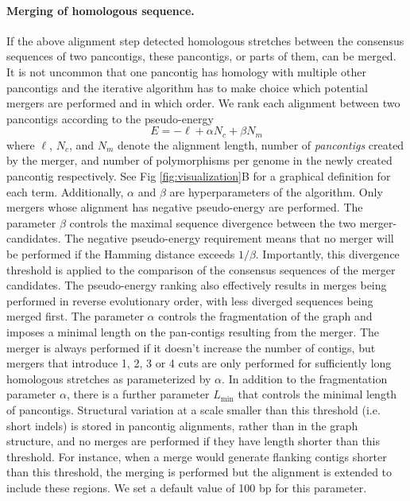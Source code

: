 \documentclass[aps,rmp,preprint,superscriptaddress,10pt,linenumbers]{revtex4-1}
\newcommand{\Lthr}{L_{\min}}
\begin{document}
\paragraph*{Merging of homologous sequence.}
If the above alignment step detected homologous stretches between the consensus sequences of two pancontigs, these pancontigs, or parts of them, can be merged.
It is not uncommon that one pancontig has homology with multiple other pancontigs and the iterative algorithm has to make choice which potential mergers are performed and in which order.
We rank each alignment between two pancontigs according to the pseudo-energy
\begin{equation}\label{eq:pseudo-energy}
    E = -\ell + \alpha N_c + \beta N_m
\end{equation}
where $\ell$, $N_c$, and $N_m$ denote the alignment length, number of \emph{pancontigs} created by the merger, and number of polymorphisms per genome in the newly created {pancontig} respectively.
See Fig \ref{fig:visualization}B for a graphical definition for each term.
Additionally, $\alpha$ and $\beta$ are hyperparameters of the algorithm.
Only mergers whose alignment has negative pseudo-energy are performed.
The parameter $\beta$ controls the maximal sequence divergence between the two merger-candidates. The negative pseudo-energy requirement means that no merger will be performed if the Hamming distance exceeds $1/\beta$.
Importantly, this divergence threshold is applied to the comparison of the consensus sequences of the merger candidates.
The pseudo-energy ranking also effectively results in merges being performed in reverse evolutionary order, with less diverged sequences being merged first.
The parameter $\alpha$ controls the fragmentation of the graph and imposes a minimal length on the pan-contigs resulting from the merger.
The merger is always performed if it doesn't increase the number of contigs, but mergers that introduce 1, 2, 3 or 4 cuts are only performed for sufficiently long homologous stretches as parameterized by $\alpha$.
In addition to the fragmentation parameter $\alpha$, there is a further parameter $\Lthr$ that controls the minimal length of pancontigs. Structural variation at a scale smaller than this threshold (i.e. short indels) is stored in pancontig alignments, rather than in the graph structure, and no merges are performed if they have length shorter than this threshold. For instance, when a merge would generate flanking contigs shorter than this threshold, the merging is performed but the alignment is extended to include these regions. We set a default value of 100 bp for this parameter.
\end{document}
